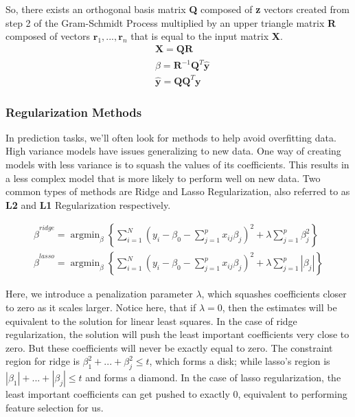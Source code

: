 \documentclass[11pt, letterpaper]{article}
\DeclareMathOperator*{\argmin}{argmin}
\renewcommand{\vec}[1]{\mathbf{#1}}
\begin{document}
So, there exists an orthogonal basis matrix \textbf{Q} composed of \textbf{z} vectors created from step 2 of the Gram-Schmidt Process multiplied by an upper triangle matrix \textbf{R} composed of vectors $\vec{r}_1,..., \vec{r}_n$ that is equal to the input matrix \textbf{X}.
\begin{align}
	&\mathbf{X} = \mathbf{QR} \\
	&\hat{\beta} = \mathbf{R}^{-1}\mathbf{Q}^T\hat{\vec{y}} \\
	&\hat{\vec{y}} = \mathbf{Q}\mathbf{Q}^T\vec{y}
\end{align}

\subsubsection{Regularization Methods}
In prediction tasks, we'll often look for methods to help avoid overfitting data. High variance models have issues generalizing to new data. One way of creating models with less variance is to squash the values of its coefficients. This results in a less complex model that is more likely to perform well on new data. Two common types of methods are Ridge and Lasso Regularization, also referred to as \textbf{L2} and \textbf{L1} Regularization respectively.

\begin{align}
	\hat{\beta}^{ridge} = \argmin_{\beta} \left\{ \sum_{i=1}^{N}(y_i - \beta_0 - \sum_{j=1}^{p} x_{ij}\beta_j)^2 + \lambda \sum_{j=1}^{p} \beta_j^2 \right\} \\
	\hat{\beta}^{lasso} = \argmin_{\beta} \left\{ \sum_{i=1}^{N}(y_i - \beta_0 - \sum_{j=1}^{p} x_{ij}\beta_j)^2 + \lambda \sum_{j=1}^{p} |\beta_j| \right\}
\end{align}

Here, we introduce a penalization parameter $\lambda$, which squashes coefficients closer to zero as it scales larger. Notice here, that if $\lambda = 0$, then the estimates will be equivalent to the solution for linear least squares. In the case of ridge regularization, the solution will push the least important coefficients very close to zero. But these coefficients will never be exactly equal to zero. The constraint region for ridge is $\beta_1^2 + ... + \beta_j^2 \leq t$, which forms a disk; while lasso's region is $|\beta_1| + ... + |\beta_j| \leq t$ and forms a diamond. In the case of lasso regularization, the least important coefficients can get pushed to exactly 0, equivalent to performing feature selection for us.
\end{document}
